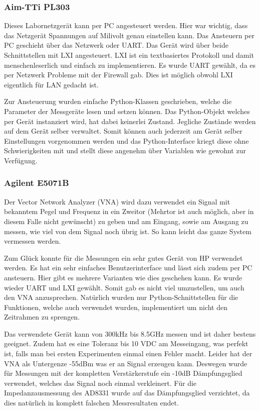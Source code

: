 \subsubsection*{Aim-TTi PL303}
Dieses Labornetzgerät kann per PC angesteuert werden. Hier war wichtig, dass das Netzgerät Spannungen auf Milivolt genau einstellen kann.
Das Ansteuern per PC geschieht über das Netzwerk oder UART. Das Gerät wird über beide Schnittstellen mit LXI angesteuert. LXI ist ein textbasiertes Protokoll und damit menschenleserlich und einfach zu implementieren. Es wurde UART gewählt, da es per Netzwerk Probleme mit der Firewall gab. Dies ist möglich obwohl LXI eigentlich für LAN gedacht ist.

Zur Ansteuerung wurden einfache Python-Klassen geschrieben, welche die Parameter der Messgeräte lesen und setzen können. Das Python-Objekt welches per Gerät instanziert wird, hat dabei keinerlei Zustand. Jegliche Zustände werden auf dem Gerät selber verwaltet. Somit können auch jederzeit am Gerät selber Einstellungen vorgenommen werden und das Python-Interface kriegt diese ohne Schwierigkeiten mit und stellt diese angenehm über Variablen wie gewohnt zur Verfügung.

\subsubsection*{Agilent E5071B}
Der Vector Network Analyzer (VNA) wird dazu verwendet ein Signal mit bekanntem Pegel und Frequenz in ein Zweitor (Mehrtor ist auch möglich, aber in diesem Falle nicht gewünscht) zu geben und am Eingang, sowie am Ausgang zu messen, wie viel von dem Signal noch übrig ist. So kann leicht das ganze System vermessen werden.

Zum Glück konnte für die Messungen ein sehr gutes Gerät von HP verwendet werden. Es hat ein sehr einfaches Benutzerinterface und lässt sich zudem per PC ansteuern. Hier gibt es mehrere Varianten wie dies geschehen kann. Es wurde wieder UART und LXI gewählt. Somit gab es nicht viel umzustellen, um auch den VNA anzusprechen. Natürlich wurden nur Python-Schnittstellen für die Funktionen, welche auch verwendet wurden, implementiert um nicht den Zeitrahmen zu sprengen.

Das verwendete Gerät kann von 300kHz bis 8.5GHz messen und ist daher bestens geeignet. Zudem hat es eine Toleranz bis 10 VDC am Messeingang, was perfekt ist, falls man bei ersten Experimenten einmal einen Fehler macht. Leider hat der VNA als Untergenze -55dBm was er an Signal erzeugen kann. Deswegen wurde für Messungen mit der kompletten Verstärkerstufe ein -10dB Dämpfungsglied verwendet, welches das Signal noch einmal verkleinert. Für die Impedanzausmessung des AD8331 wurde auf das Dämpfungsglied verzichtet, da dies natürlich in komplett falschen Messresultaten endet.

